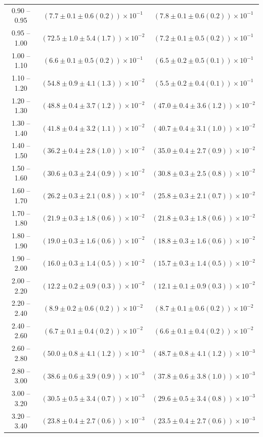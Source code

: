 \begin{table}
\begin{center}
\begin{tabular}{ c | c c }
0.90 -- 0.95 & $(7.7\pm0.1\pm0.6(0.2))\times10^{-1}$ & $(7.8\pm0.1\pm0.6(0.2))\times10^{-1}$ \\ 
0.95 -- 1.00 & $(72.5\pm1.0\pm5.4(1.7))\times10^{-2}$ & $(7.2\pm0.1\pm0.5(0.2))\times10^{-1}$ \\ 
1.00 -- 1.10 & $(6.6\pm0.1\pm0.5(0.2))\times10^{-1}$ & $(6.5\pm0.2\pm0.5(0.1))\times10^{-1}$ \\ 
1.10 -- 1.20 & $(54.8\pm0.9\pm4.1(1.3))\times10^{-2}$ & $(5.5\pm0.2\pm0.4(0.1))\times10^{-1}$ \\ 
1.20 -- 1.30 & $(48.8\pm0.4\pm3.7(1.2))\times10^{-2}$ & $(47.0\pm0.4\pm3.6(1.2))\times10^{-2}$ \\ 
1.30 -- 1.40 & $(41.8\pm0.4\pm3.2(1.1))\times10^{-2}$ & $(40.7\pm0.4\pm3.1(1.0))\times10^{-2}$ \\ 
1.40 -- 1.50 & $(36.2\pm0.4\pm2.8(1.0))\times10^{-2}$ & $(35.0\pm0.4\pm2.7(0.9))\times10^{-2}$ \\ 
1.50 -- 1.60 & $(30.6\pm0.3\pm2.4(0.9))\times10^{-2}$ & $(30.8\pm0.3\pm2.5(0.8))\times10^{-2}$ \\ 
1.60 -- 1.70 & $(26.2\pm0.3\pm2.1(0.8))\times10^{-2}$ & $(25.8\pm0.3\pm2.1(0.7))\times10^{-2}$ \\ 
1.70 -- 1.80 & $(21.9\pm0.3\pm1.8(0.6))\times10^{-2}$ & $(21.8\pm0.3\pm1.8(0.6))\times10^{-2}$ \\ 
1.80 -- 1.90 & $(19.0\pm0.3\pm1.6(0.6))\times10^{-2}$ & $(18.8\pm0.3\pm1.6(0.6))\times10^{-2}$ \\ 
1.90 -- 2.00 & $(16.0\pm0.3\pm1.4(0.5))\times10^{-2}$ & $(15.7\pm0.3\pm1.4(0.5))\times10^{-2}$ \\ 
2.00 -- 2.20 & $(12.2\pm0.2\pm0.9(0.3))\times10^{-2}$ & $(12.1\pm0.1\pm0.9(0.3))\times10^{-2}$ \\ 
2.20 -- 2.40 & $(8.9\pm0.2\pm0.6(0.2))\times10^{-2}$ & $(8.7\pm0.1\pm0.6(0.2))\times10^{-2}$ \\ 
2.40 -- 2.60 & $(6.7\pm0.1\pm0.4(0.2))\times10^{-2}$ & $(6.6\pm0.1\pm0.4(0.2))\times10^{-2}$ \\ 
2.60 -- 2.80 & $(50.0\pm0.8\pm4.1(1.2))\times10^{-3}$ & $(48.7\pm0.8\pm4.1(1.2))\times10^{-3}$ \\ 
2.80 -- 3.00 & $(38.6\pm0.6\pm3.9(0.9))\times10^{-3}$ & $(37.8\pm0.6\pm3.8(1.0))\times10^{-3}$ \\ 
3.00 -- 3.20 & $(30.5\pm0.5\pm3.4(0.7))\times10^{-3}$ & $(29.6\pm0.5\pm3.4(0.8))\times10^{-3}$ \\ 
3.20 -- 3.40 & $(23.8\pm0.4\pm2.7(0.6))\times10^{-3}$ & $(23.5\pm0.4\pm2.7(0.6))\times10^{-3}$ \\ 

\end{tabular}
\end{center}
\end{table}
